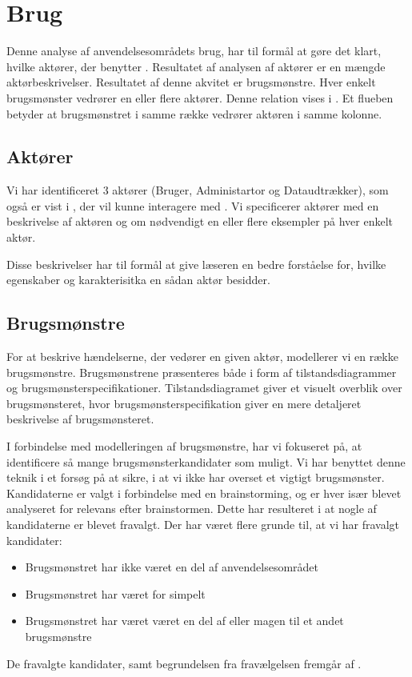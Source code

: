 \section{Brug}
\label{sec:brug}
Denne analyse af anvendelsesområdets brug, har til formål at gøre det klart, hvilke aktører, der benytter \Foodl{}. Resultatet af analysen af aktører er en mængde aktørbeskrivelser. Resultatet af denne akvitet er brugsmønstre. Hver enkelt brugsmønster vedrører en eller flere aktører. Denne relation vises i . Et flueben betyder at brugsmønstret i samme række vedrører aktøren i samme kolonne.



\subsection{Aktører}
\label{sec:aktoerer}
Vi har identificeret 3 aktører (Bruger, Administartor og Dataudtrækker), som også er vist i , der vil kunne interagere med \Foodl{}. Vi specificerer aktører med en beskrivelse af aktøren og om nødvendigt en eller flere eksempler på hver enkelt aktør.

Disse beskrivelser har til formål at give læseren en bedre forståelse for, hvilke egenskaber og karakterisitka en sådan aktør besidder. 



\subsection{Brugsmønstre}
\label{subsec:brugsmoenstre}
For at beskrive hændelserne, der vedører en given aktør, modellerer vi en række brugsmønstre. Brugsmønstrene præsenteres både i form af  tilstandsdiagrammer og brugsmønsterspecifikationer. Tilstandsdiagramet giver et visuelt overblik over brugsmønsteret, hvor brugsmønsterspecifikation giver en mere detaljeret beskrivelse af brugsmønsteret.

I forbindelse med modelleringen af brugsmønstre, har vi fokuseret på, at identificere så mange brugsmønsterkandidater som muligt. Vi har benyttet denne teknik i et forsøg på at sikre, i at vi ikke har overset et vigtigt brugsmønster. Kandidaterne er valgt i forbindelse med en brainstorming, og er hver især blevet analyseret for relevans efter brainstormen. Dette har resulteret i at nogle af kandidaterne er blevet fravalgt. Der har været flere grunde til, at vi har fravalgt kandidater:

\begin{itemize}[noitemsep]
\item Brugsmønstret har ikke været en del af anvendelsesområdet
\item Brugsmønstret har været for simpelt
\item Brugsmønstret har været været en del af eller magen til et andet brugsmønstre
\end{itemize}

De fravalgte kandidater, samt begrundelsen fra fravælgelsen fremgår af .


